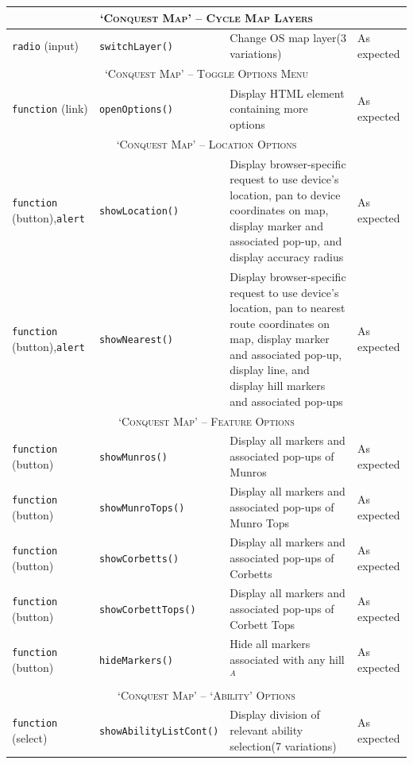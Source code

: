 \documentclass[11pt, english]{article}
\begin{document}
\begin{center}
\begin{longtable}{p{2.5cm}p{3.5cm}p{5cm}p{1.75cm}}
		\hline
		\multicolumn{4}{c}{\textsc{`Conquest Map' -- Cycle Map Layers}}\\
		\hline
		\texttt{radio} (input) & \texttt{switchLayer()} & Change OS map layer\newline (3 variations) & As expected\\
		\hline
		\multicolumn{4}{c}{\textsc{`Conquest Map' -- Toggle Options Menu}}\\
		\hline
		\texttt{function} (link) & \texttt{openOptions()} & Display HTML element containing more options & As expected\\
		\hline
		\multicolumn{4}{c}{\textsc{`Conquest Map' -- Location Options}}\\
		\hline
		\texttt{function} (button),\newline \texttt{alert} & \texttt{showLocation()} & Display browser-specific request to use device's location, pan to device coordinates on map, display marker and associated pop-up, and display accuracy radius & As expected\\
		\texttt{function} (button),\newline \texttt{alert} & \texttt{showNearest()} & Display browser-specific request to use device's location, pan to nearest route coordinates on map, display marker and associated pop-up, display line, and display hill markers and associated pop-ups & As expected\\
		\hline
		\multicolumn{4}{c}{\textsc{`Conquest Map' -- Feature Options}}\\
		\hline
		\texttt{function} (button) & \texttt{showMunros()} & Display all markers and associated pop-ups of Munros & As expected\\
		\texttt{function} (button) & \texttt{showMunroTops()} & Display all markers and associated pop-ups of Munro Tops & As expected\\
		\texttt{function} (button) & \texttt{showCorbetts()} & Display all markers and associated pop-ups of Corbetts & As expected\\
		\texttt{function} (button) & \texttt{showCorbettTops()} & Display all markers and associated pop-ups of Corbett Tops & As expected\\
		\texttt{function} (button) & \texttt{hideMarkers()} & Hide all markers associated with any hill$^{A}$ & As expected\\
		\hline
		\multicolumn{4}{c}{\textsc{`Conquest Map' -- `Ability' Options}}\\
		\hline
		\texttt{function} (select) & \texttt{showAbilityListCont()} & Display division of relevant ability selection\newline (7 variations) & As expected\\

\end{longtable}
\end{center}
\end{document}
